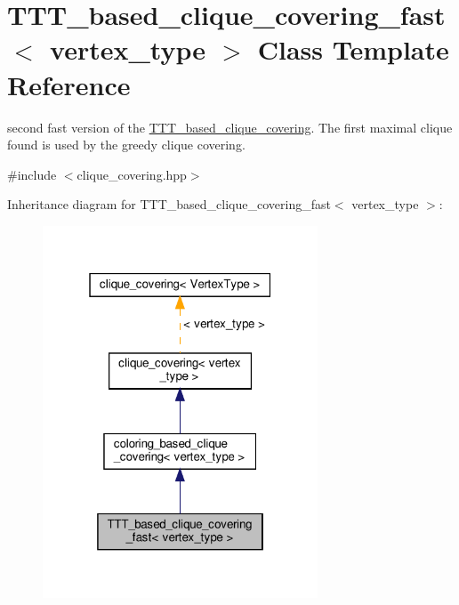 \hypertarget{classTTT__based__clique__covering__fast}{}\section{T\+T\+T\+\_\+based\+\_\+clique\+\_\+covering\+\_\+fast$<$ vertex\+\_\+type $>$ Class Template Reference}
\label{classTTT__based__clique__covering__fast}


second fast version of the \hyperlink{classTTT__based__clique__covering}{T\+T\+T\+\_\+based\+\_\+clique\+\_\+covering}. The first maximal clique found is used by the greedy clique covering.  




{\ttfamily \#include $<$clique\+\_\+covering.\+hpp$>$}



Inheritance diagram for T\+T\+T\+\_\+based\+\_\+clique\+\_\+covering\+\_\+fast$<$ vertex\+\_\+type $>$\+:
\nopagebreak
\begin{figure}[H]
\begin{center}
\leavevmode
\includegraphics[width=232pt]{d6/d1c/classTTT__based__clique__covering__fast__inherit__graph}
\end{center}
\end{figure}


